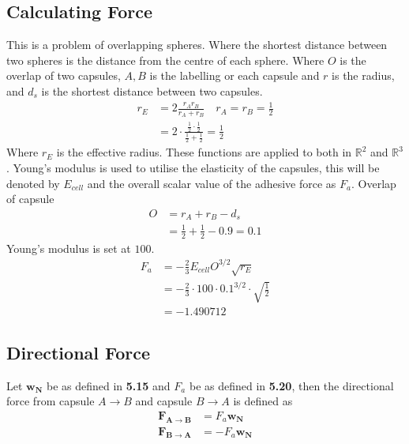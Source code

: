 \subsection{Calculating Force}
This is a problem of overlapping spheres. Where the shortest distance between two spheres is the distance from the centre of each sphere. 
Where $O$ is the overlap of two capsules, $A,B$ is the labelling or each capsule and $r$ is the radius, and $d_s$ is the shortest distance between two capsules. 
\begin{align}
    r_E & = 2\frac{r_Ar_B}{r_A + r_B} \quad r_A = r_B = \frac{1}{2} \\
    & = 2\cdot\frac{\frac{1}{2}\cdot\frac{1}{2}}{\frac{1}{2}+\frac{1}{2}} = \frac{1}{2}
\end{align}
Where $r_E$ is the effective radius. These functions are applied to both in $\mathbb{R}^2$ and $\mathbb{R}^3$. Young's modulus is used to utilise the elasticity of the capsules, this will be denoted by $E_{cell}$ and the overall scalar value of the adhesive force as $F_a$.
Overlap of capsule
\begin{align}
    O & = r_A+r_B-d_s \\
    & = \frac{1}{2} + \frac{1}{2} - 0.9 = 0.1 
\end{align}
Young's modulus is set at $100$.
\begin{align}
    F_a & = -\frac{2}{3}E_{cell}O^{3/2}\sqrt{r_E} \\
    & = -\frac{2}{3} \cdot 100 \cdot 0.1^{3/2}  \cdot \sqrt{\frac{1}{2}} \\
    & = -1.490712
\end{align}
\subsection{Directional Force}
Let $\mathbf{w_N}$ be as defined in \textbf{5.15} and $F_a$ be as defined in \textbf{5.20}, then the directional force from capsule $A \rightarrow B$ and capsule $B \rightarrow A$ is defined as 
\begin{align}
    \mathbf{F_{A\rightarrow B}} & = F_a\mathbf{w_N}\\
    \mathbf{F_{B\rightarrow A}} & = -F_a\mathbf{w_N}
\end{align}
